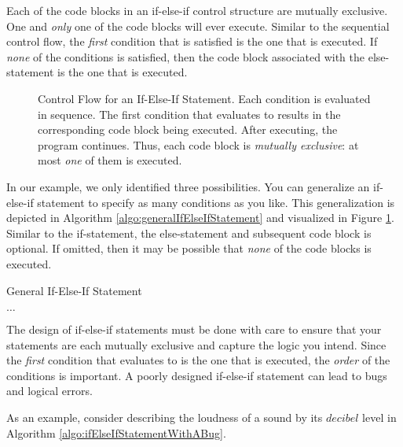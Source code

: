 Each of the code blocks in an if-else-if control structure are 
mutually exclusive.  One and \emph{only} one of the code blocks will 
ever execute.  Similar to the sequential control flow, the \emph{first} 
condition that is satisfied is the one that is executed.  If \emph{none} of the
conditions is satisfied, then the code block associated with the else-statement
is the one that is executed.   

\begin{figure}
\centering

\caption[Control Flow for an If-Else-If Statement]{Control Flow for an If-Else-If Statement.  Each
condition is evaluated in sequence.  The first condition that evaluates to \True results in
the corresponding code block being executed.  After executing, the program continues.  Thus,
each code block is \emph{mutually exclusive}: at most \emph{one} of them is executed.}
\label{figure:figureIfElseIfFlowChart}
\end{figure}

In our example, we only identified three possibilities.  You can generalize an
if-else-if statement to specify as many conditions as you like.  This generalization
is depicted in Algorithm \ref{algo:generalIfElseIfStatement} and visualized in Figure 
\ref{figure:figureIfElseIfFlowChart}.  Similar to the 
if-statement, the else-statement and subsequent code block is optional.  
If omitted, then it may  be possible that \emph{none} of the code blocks is executed.

\begin{algorithm}[H]
\caption{General If-Else-If Statement}
\label{algo:generalIfElseIfStatement}
$\ldots$ \;
\end{algorithm}

The design of if-else-if statements must be done with care to ensure
that your statements are each mutually exclusive and capture the logic
you intend.  Since the \emph{first} condition that evaluates to \True is
the one that is executed, the \emph{order} of the conditions is important.
A poorly designed if-else-if statement can lead to \glspl{bug} and logical
errors.  

As an example, consider describing the loudness of a sound by its
$decibel$ level in Algorithm \ref{algo:ifElseIfStatementWithABug}.

